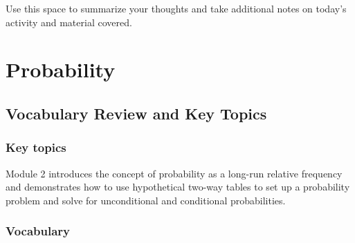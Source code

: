 \documentclass[
]{report}
\begin{document}
Use this space to summarize your thoughts and take additional notes on today's activity and material covered.

\newpage

\chapter{Probability}\label{probability}

\section{Vocabulary Review and Key Topics}\label{vocabulary-review-and-key-topics-1}

\subsection{Key topics}\label{key-topics-1}

Module 2 introduces the concept of probability as a long-run relative frequency and demonstrates how to use hypothetical two-way tables to set up a probability problem and solve for unconditional and conditional probabilities.

\subsection{Vocabulary}\label{vocabulary-1}
\end{document}
